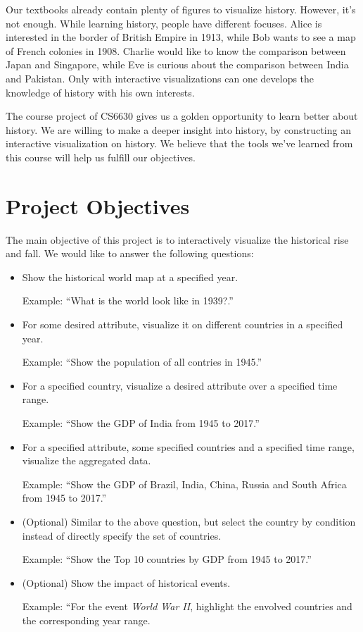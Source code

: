 \documentclass[12pt, fullpage,letterpaper]{article}
\begin{document}
Our textbooks already contain plenty of figures to visualize history. However,
it's not enough. While learning history, people have different focuses.  Alice
is interested in the border of British Empire in 1913, while Bob wants to see a
map of French colonies in 1908. Charlie would like to know the comparison
between Japan and Singapore, while Eve is curious about the comparison between
India and Pakistan.  Only with interactive visualizations can one develops the
knowledge of history with his own interests.

The course project of CS6630 gives us a golden opportunity to learn better
about history.  We are willing to make a deeper insight into history, by
constructing an interactive visualization on history. We believe that the tools
we've learned from this course will help us fulfill our objectives.


\section{Project Objectives}
The main objective of this project is to interactively visualize the historical rise
and fall.  We would like to answer the following questions:
\begin{itemize}
    \item Show the historical world map at a specified year.

        Example: ``What is the world look like in 1939?.''

    \item For some desired attribute, visualize it on different countries in a specified year.

        Example: ``Show the population of all contries in 1945.''

    \item For a specified country, visualize a desired attribute over a specified time range.

        Example: ``Show the GDP of India from 1945 to 2017.''

    \item For a specified attribute, some specified countries and a specified time range, visualize the aggregated data.

        Example: ``Show the GDP of Brazil, India, China, Russia and South Africa from 1945 to 2017.''

    \item (Optional) Similar to the above question, but select the country by condition instead of directly specify the set of countries.

        Example: ``Show the Top 10 countries by GDP from 1945 to 2017.''

    \item (Optional) Show the impact of historical events.

        Example: ``For the event \emph{World War II}, highlight the envolved countries and the corresponding year range.
\end{itemize}
\end{document}
